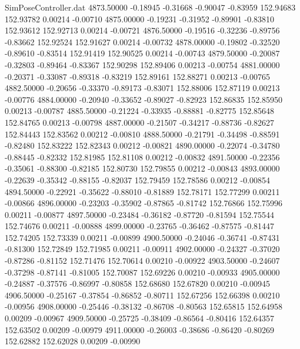 \begin{filecontents}{SimPoseController.dat}
4873.50000   -0.18945   -0.31668    -0.90047   -0.83959  152.94683  152.93782    0.00214   -0.00710
4875.00000   -0.19231   -0.31952    -0.89901   -0.83810  152.93612  152.92713    0.00214   -0.00721
4876.50000   -0.19516   -0.32236    -0.89756   -0.83662  152.92524  152.91627    0.00214   -0.00732
4878.00000   -0.19802   -0.32520    -0.89610   -0.83514  152.91419  152.90525    0.00214   -0.00743
4879.50000   -0.20087   -0.32803    -0.89464   -0.83367  152.90298  152.89406    0.00213   -0.00754
4881.00000   -0.20371   -0.33087    -0.89318   -0.83219  152.89161  152.88271    0.00213   -0.00765
4882.50000   -0.20656   -0.33370    -0.89173   -0.83071  152.88006  152.87119    0.00213   -0.00776
4884.00000   -0.20940   -0.33652    -0.89027   -0.82923  152.86835  152.85950    0.00213   -0.00787
4885.50000   -0.21224   -0.33935    -0.88881   -0.82775  152.85648  152.84765    0.00213   -0.00798
4887.00000   -0.21507   -0.34217    -0.88736   -0.82627  152.84443  152.83562    0.00212   -0.00810
4888.50000   -0.21791   -0.34498    -0.88591   -0.82480  152.83222  152.82343    0.00212   -0.00821
4890.00000   -0.22074   -0.34780    -0.88445   -0.82332  152.81985  152.81108    0.00212   -0.00832
4891.50000   -0.22356   -0.35061    -0.88300   -0.82185  152.80730  152.79855    0.00212   -0.00843
4893.00000   -0.22639   -0.35342    -0.88155   -0.82037  152.79459  152.78586    0.00212   -0.00854
4894.50000   -0.22921   -0.35622    -0.88010   -0.81889  152.78171  152.77299    0.00211   -0.00866
4896.00000   -0.23203   -0.35902    -0.87865   -0.81742  152.76866  152.75996    0.00211   -0.00877
4897.50000   -0.23484   -0.36182    -0.87720   -0.81594  152.75544  152.74676    0.00211   -0.00888
4899.00000   -0.23765   -0.36462    -0.87575   -0.81447  152.74205  152.73339    0.00211   -0.00899
4900.50000   -0.24046   -0.36741    -0.87431   -0.81300  152.72849  152.71985    0.00211   -0.00911
4902.00000   -0.24327   -0.37020    -0.87286   -0.81152  152.71476  152.70614    0.00210   -0.00922
4903.50000   -0.24607   -0.37298    -0.87141   -0.81005  152.70087  152.69226    0.00210   -0.00933
4905.00000   -0.24887   -0.37576    -0.86997   -0.80858  152.68680  152.67820    0.00210   -0.00945
4906.50000   -0.25167   -0.37854    -0.86852   -0.80711  152.67256  152.66398    0.00210   -0.00956
4908.00000   -0.25446   -0.38132    -0.86708   -0.80563  152.65815  152.64958    0.00209   -0.00967
4909.50000   -0.25725   -0.38409    -0.86564   -0.80416  152.64357  152.63502    0.00209   -0.00979
4911.00000   -0.26003   -0.38686    -0.86420   -0.80269  152.62882  152.62028    0.00209   -0.00990

\end{filecontents}

